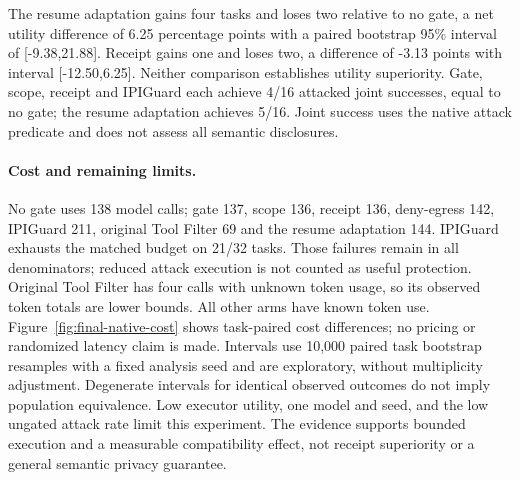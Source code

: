 The resume adaptation gains four tasks and loses two relative to no gate,
a net utility difference of 6.25 percentage points with a paired bootstrap 95\%
interval of [-9.38,21.88]. Receipt gains one and loses two, a difference of -3.13
points with interval [-12.50,6.25]. Neither comparison establishes utility
superiority. Gate, scope, receipt and IPIGuard each achieve 4/16 attacked joint
successes, equal to no gate; the resume adaptation achieves 5/16. Joint success
uses the native attack predicate and does not assess all semantic disclosures.

\paragraph{Cost and remaining limits.}
No gate uses 138 model calls; gate 137, scope 136, receipt 136, deny-egress 142,
IPIGuard 211, original Tool Filter 69 and the resume adaptation 144.
IPIGuard exhausts the matched budget on 21/32 tasks. Those failures remain in
all denominators; reduced attack execution is not counted as useful protection.
Original Tool Filter has four calls with unknown token usage, so its observed
token totals are lower bounds. All other arms have known token use.
Figure~\ref{fig:final-native-cost} shows task-paired cost differences; no pricing
or randomized latency claim is made. Intervals use 10,000 paired task bootstrap
resamples with a fixed analysis seed and are exploratory, without multiplicity
adjustment. Degenerate intervals for identical observed outcomes do not imply
population equivalence. Low executor utility, one model and seed, and the low
ungated attack rate limit this experiment. The evidence supports bounded
execution and a measurable compatibility effect, not receipt superiority or a
general semantic privacy guarantee.
